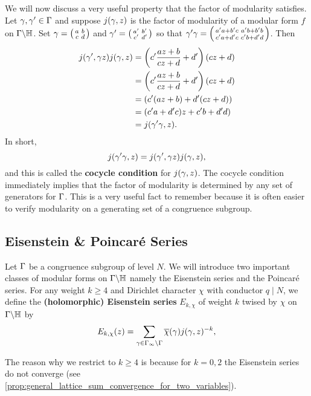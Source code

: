       We will now discuss a very useful property that the factor of modularity satisfies. Let $\gamma,\gamma' \in \Gamma$ and suppose $j(\gamma,z)$ is the factor of modularity of a modular form $f$ on $\Gamma\backslash\mathbb{H}$. Set $\gamma = \begin{psmallmatrix} a & b \\ c & d \end{psmallmatrix}$ and $\gamma' = \begin{psmallmatrix} a' & b' \\ c' & d' \end{psmallmatrix}$ so that $\gamma'\gamma = \begin{psmallmatrix} a'a+b'c & a'b+b'b \\ c'a+d'c & c'b+d'd \end{psmallmatrix}$. Then
      \begin{align*}
        j(\gamma',\gamma z)j(\gamma,z) &= \left(c'\frac{az+b}{cz+d}+d'\right)(cz+d) \\
        &= \left(c'\frac{az+b}{cz+d}+d'\right)(cz+d) \\
        &= (c'(az+b)+d'(cz+d)) \\
        &= (c'a+d'c)z+c'b+d'd) \\
        &= j(\gamma'\gamma,z).
      \end{align*}
      In short,
      \[
        j(\gamma'\gamma,z) =  j(\gamma',\gamma z)j(\gamma,z),
      \]
      and this is called the \textbf{cocycle condition} for $j(\gamma,z)$. The cocycle condition immediately implies that the factor of modularity is determined by any set of generators for $\Gamma$. This is a very useful fact to remember because it is often easier to verify modularity on a generating set of a congruence subgroup.
    \subsection*{Eisenstein \& Poincar\'e Series}
      Let $\Gamma$ be a congruence subgroup of level $N$. We will introduce two important classes of modular forms on $\Gamma\backslash\mathbb{H}$ namely the Eisenstein series and the Poincar\'e series. For any weight $k \ge 4$ and Dirichlet character $\chi$ with conductor $q \mid N$, we define the \textbf{(holomorphic) Eisenstein series} $E_{k,\chi}$ of weight $k$ twised by $\chi$ on $\Gamma\backslash\mathbb{H}$ by
      \[
        E_{k,\chi}(z) = \sum_{\gamma \in \Gamma_{\infty}\backslash\Gamma}\overline{\chi}(\gamma)j(\gamma,z)^{-k},
      \]

      \begin{remark}
        The reason why we restrict to $k \ge 4$ is because for $k = 0,2$ the Eisenstein series do not converge (see \cref{prop:general_lattice_sum_convergence_for_two_variables}).
      \end{remark}

